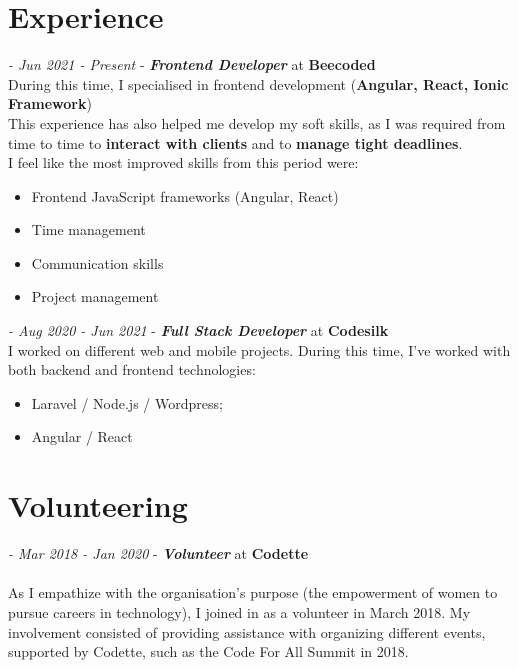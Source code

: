 \documentclass{article}
\begin{document}
    
    \begin{multicols}{2}
    
    \section*{ Experience }
    \large \textit{- Jun 2021 - Present} - \textbf{\textit{Frontend Developer}} at \textbf{Beecoded}
        \vspace{0.35cm}\\ \normalsize \indent During this time, I specialised in frontend development (\textbf{Angular, React, Ionic Framework})
        \\ \indent This experience has also helped me develop my soft skills, as I was required from time to time to \textbf{interact with clients} and to \textbf{manage tight deadlines}.
        \\ \indent I feel like the most improved skills from this period were:
        \begin{itemize}
            \item Frontend JavaScript frameworks (Angular, React)
            \item Time management
            \item Communication skills
            \item Project management
        \end{itemize}
        
    \vspace{0.5cm}
    \large \textit{- Aug 2020 - Jun 2021} - \textbf{\textit{Full Stack Developer}} at \textbf{Codesilk}
        \vspace{0.35cm}\\ \normalsize \indent I worked on different web and mobile projects. During this time, I've worked with both backend and frontend technologies:
        \begin{itemize}
            \item Laravel / Node.js / Wordpress;
            \item Angular / React
        \end{itemize}
    
    \section*{ Volunteering }
        
        \large \textit{- Mar 2018 - Jan 2020} - \textbf{\textit{Volunteer}} at \textbf{Codette}
        \\ \\ \normalsize \indent As I empathize with the organisation's purpose (the empowerment of women to pursue careers in technology), I joined in as a volunteer in March 2018. My involvement consisted of providing assistance with organizing different events, supported by Codette, such as the Code For All Summit in 2018.
        

\end{multicols}
\end{document}
